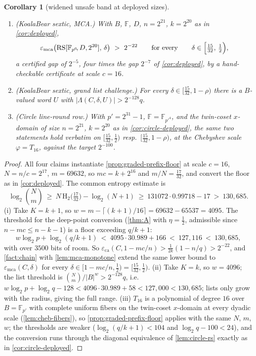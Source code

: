 \documentclass[11pt]{article}
\newtheorem{corollary}[theorem]{Corollary}
\theoremstyle{definition}
\theoremstyle{remark}
\newcommand{\F}{\mathbb{F}}
\newcommand{\B}{B}
\newcommand{\RS}{\mathrm{RS}}
\newcommand{\eca}{\varepsilon_{\mathrm{ca}}}
\newcommand{\emca}{\varepsilon_{\mathrm{mca}}}
\newcommand{\Lst}{\Lambda}
\newcommand{\Hb}{\mathrm{H}_2}
\begin{document}
\begin{corollary}[widened unsafe band at deployed sizes]\label{cor:widened-deployed}
\begin{enumerate}[label=\textup{(\roman*)}]
\item \textup{(KoalaBear sextic, MCA.)} With $\B$, $\F$, $D$, $n=2^{21}$, $k=2^{20}$ as in \cref{cor:deployed},
\[
\emca\bigl(\RS[\F_{p^6}\!,D,2^{20}],\,\delta\bigr)\ >\ 2^{-22}
\qquad\text{for every}\qquad
\delta\in\Bigl[\tfrac{15}{32},\,\tfrac12\Bigr),
\]
a certified gap of $2^{-5}$, four times the gap $2^{-7}$ of \cref{cor:deployed}, by a hand-checkable certificate at scale $c=16$.
\item \textup{(KoalaBear sextic, grand list challenge.)} For every $\delta\in[\tfrac{15}{32},1-\rho)$ there is a $\B$-valued word $U$ with $|\Lst(C,\delta,U)|>2^{-128}q$.
\item \textup{(Circle line-round row.)} With $p'=2^{31}-1$, $\F=\F_{p'^4}$, and the twin-coset $x$-domain of size $n=2^{21}$, $k=2^{20}$ as in \cref{cor:circle-deployed}, the same two statements hold verbatim on $[\tfrac{15}{32},\tfrac12)$ resp.\ $[\tfrac{15}{32},1-\rho)$, at the Chebyshev scale $\varphi=T_{16}$, against the target $2^{-100}$.
\end{enumerate}
\end{corollary}

\begin{proof}
All four claims instantiate \cref{prop:graded-prefix-floor} at scale $c=16$, $N=n/c=2^{17}$, $m=69632$, so $mc=k+2^{16}$ and $m/N=\tfrac{17}{32}$, and convert the floor as in \cref{cor:deployed}. The common entropy estimate is
\[
\log_2\binom{N}{m}\ \ge\ N\,\Hb\bigl(\tfrac{17}{32}\bigr)-\log_2(N+1)\ \ge\ 131072\cdot0.99718-17\ >\ 130{,}685 .
\]
\textup{(i)} Take $K=k+1$, so $w=m-\lceil(k+1)/16\rceil=69632-65537=4095$. The threshold for the deep-point conversion (\cref{thm:A} with $\eta=\tfrac12$, admissible since $n-mc\le n-k-1$) is a floor exceeding $q/k+1$:
\[
w\log_2p+\log_2(q/k+1)\ <\ 4095\cdot30.989+166\ <\ 127{,}116\ <\ 130{,}685 ,
\]
with over $3500$ bits of room. So $\eca(C,1-mc/n)>\tfrac1{2k}(1-n/q)>2^{-22}$, and \cref{fact:chain} with \cref{lem:mca-monotone} extend the same lower bound to $\emca(C,\delta)$ for every $\delta\in[1-mc/n,\tfrac12)=[\tfrac{15}{32},\tfrac12)$.
\textup{(ii)} Take $K=k$, so $w=4096$; the list threshold is $\binom Nm/|\B|^w>2^{-128}q$, i.e.\ $w\log_2p+\log_2q-128<4096\cdot30.989+58<127{,}000<130{,}685$; lists only grow with the radius, giving the full range.
\textup{(iii)} $T_{16}$ is a polynomial of degree $16$ over $\B=\F_{p'}$ with complete uniform fibers on the twin-coset $x$-domain at every dyadic scale (\cref{lem:cheb-fibers}), so \cref{prop:graded-prefix-floor} applies with the same $N$, $m$, $w$; the thresholds are weaker ($\log_2(q/k+1)<104$ and $\log_2q-100<24$), and the conversion runs through the diagonal equivalence of \cref{lem:circle-rs} exactly as in \cref{cor:circle-deployed}.
\end{proof}
\end{document}
